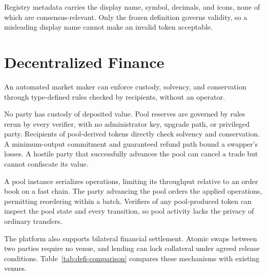 Registry metadata carries the display name, symbol, decimals, and icons, none of which are consensus-relevant. Only the frozen definition governs validity, so a misleading display name cannot make an invalid token acceptable.

\section{Decentralized Finance}

An automated market maker can enforce custody, solvency, and conservation through type-defined rules checked by recipients, without an operator.

No party has custody of deposited value. Pool reserves are governed by rules rerun by every verifier, with no administrator key, upgrade path, or privileged party. Recipients of pool-derived tokens directly check solvency and conservation. A minimum-output commitment and guaranteed refund path bound a swapper's losses. A hostile party that successfully advances the pool can cancel a trade but cannot confiscate its value.

A pool instance serializes operations, limiting its throughput relative to an order book on a fast chain. The party advancing the pool orders the applied operations, permitting reordering within a batch. Verifiers of any pool-produced token can inspect the pool state and every transition, so pool activity lacks the privacy of ordinary transfers.

The platform also supports bilateral financial settlement. Atomic swaps between two parties require no venue, and lending can lock collateral under agreed release conditions. Table~\ref{tab:defi-comparison} compares these mechanisms with existing venues.

